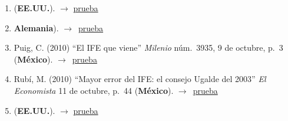 \documentclass[12 pt, letter]{article}
\newenvironment{CitasMiTrabajo}{
    \begin{footnotesize}
    \begin{enumerate}[label={\footnotesize\emph{cita~\arabic*}},ref=\arabic*] %
        \setlength{\itemsep}{.1\itemsep}
        \setlength{\parskip}{.1\parskip}
    }{\end{enumerate}\end{footnotesize}}
\begin{document}

        \begin{CitasMiTrabajo}

        \item {} (\textbf{EE.UU.}). $\rightarrow$ \href{https://doi.org/10.1080/13510347.2019.1641797}{prueba}
          
        \item {} {\textbf{Alemania}}). $\rightarrow$~\href{https://github.com/emagar/cv/blob/master/citasMiTrab/magarEtalIFEDinam/lara2015.pdf}{prueba}

        \item Puig, C. (2010)
        ``El
        IFE que viene'' \emph{Milenio} n\'um.\ 3935, 9 de octubre, p.~3 (\textbf{M\'exico}). $\rightarrow$~\href{https://github.com/emagar/cv/blob/master/citasMiTrab/magarEtalIFEDinam/puig.pdf}{prueba}

        \item Rub\'i, M. (2010)
        ``Mayor error del IFE: el consejo Ugalde del 2003'' \emph{El Economista} 11 de octubre, p.~44 (\textbf{M\'exico}). $\rightarrow$~\href{https://github.com/emagar/cv/blob/master/citasMiTrab/magarEtalIFEDinam/rubi.pdf}{prueba}

        \item {} (\textbf{EE.UU.}). $\rightarrow$ \href{https://doi.org/10.1089/elj.2018.0512}{prueba}

        \label{ncites:magar.estevez.rosas.2010} %

        \end{CitasMiTrabajo}
\end{document}

